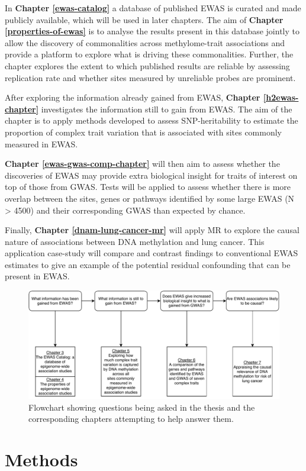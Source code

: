 \documentclass[11pt,oneside]{bristolthesis}
\begin{document}
In \textbf{Chapter \ref{ewas-catalog}} a database of published EWAS is curated and made publicly available, which will be used in later chapters. The aim of \textbf{Chapter \ref{properties-of-ewas}} is to analyse the results present in this database jointly to allow the discovery of commonalities across methylome-trait associations and provide a platform to explore what is driving these commonalities. Further, the chapter explores the extent to which published results are reliable by assessing replication rate and whether sites measured by unreliable probes are prominent.

After exploring the information already gained from EWAS, \textbf{Chapter \ref{h2ewas-chapter}} investigates the information still to gain from EWAS. The aim of the chapter is to apply methods developed to assess SNP-heritability to estimate the proportion of complex trait variation that is associated with sites commonly measured in EWAS.

\textbf{Chapter \ref{ewas-gwas-comp-chapter}} will then aim to assess whether the discoveries of EWAS may provide extra biological insight for traits of interest on top of those from GWAS. Tests will be applied to assess whether there is more overlap between the sites, genes or pathways identified by some large EWAS (N \textgreater{} 4500) and their corresponding GWAS than expected by chance.

Finally, \textbf{Chapter \ref{dnam-lung-cancer-mr}} will apply MR to explore the causal nature of associations between DNA methylation and lung cancer. This application case-study will compare and contrast findings to conventional EWAS estimates to give an example of the potential residual confounding that can be present in EWAS.


\begin{figure}

{\centering \includegraphics[width=1\linewidth]{figure/01-introduction/thesis-flowchart} 

}

\caption{Flowchart showing questions being asked in the thesis and the corresponding chapters attempting to help answer them.}\label{fig:thesis-flowchart}
\end{figure}
\hypertarget{methods}{%
\chapter{Methods}\label{methods}}
\end{document}
